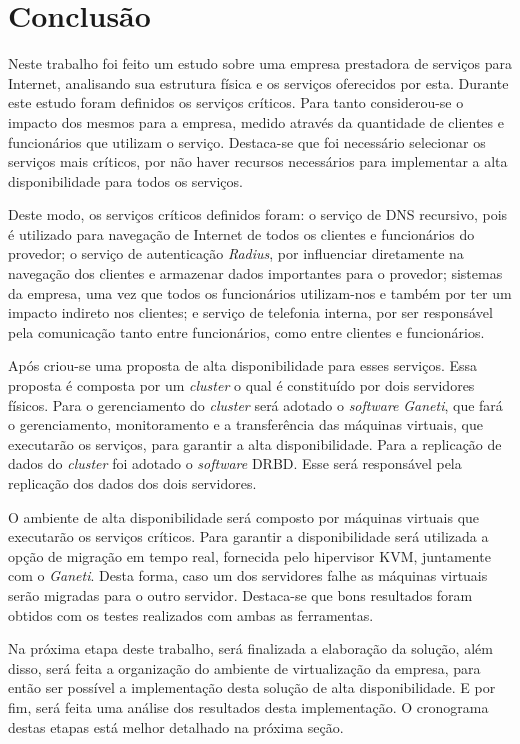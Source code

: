 \chapter{Conclusão}
\label{cap:conclusao}

Neste trabalho foi feito um estudo sobre uma empresa prestadora de serviços para Internet, analisando sua estrutura física e os serviços oferecidos 
por esta. Durante este estudo foram definidos os serviços críticos. Para tanto considerou-se o impacto dos mesmos para a empresa, medido através
da quantidade de clientes e funcionários que utilizam o serviço. Destaca-se que foi necessário selecionar os serviços mais críticos, por não 
haver recursos necessários para implementar a alta disponibilidade para todos os serviços.

Deste modo, os serviços críticos definidos foram: o serviço de \ac{DNS} recursivo, pois é utilizado para navegação de Internet de todos os clientes 
e funcionários do provedor; o serviço de autenticação \textit{Radius}, por influenciar diretamente na navegação dos clientes e armazenar dados 
importantes para o provedor; sistemas da empresa, uma vez que todos os funcionários utilizam-nos e também por ter um impacto indireto nos 
clientes; e serviço de telefonia interna, por ser responsável pela comunicação tanto entre funcionários, como entre clientes e funcionários.

Após criou-se uma proposta de alta disponibilidade para esses serviços. Essa proposta é composta por um \textit{cluster} o qual é constituído 
por dois servidores físicos. Para o gerenciamento do \textit{cluster} será adotado o \textit{software} \textit{Ganeti}, que fará o gerenciamento, 
monitoramento e a transferência das máquinas virtuais, que executarão os serviços, para garantir a alta disponibilidade. Para a replicação de dados 
do \textit{cluster} foi adotado o \textit{software} \ac{DRBD}. Esse será responsável pela replicação dos dados dos dois servidores.

O ambiente de alta disponibilidade será composto por máquinas virtuais que executarão os serviços críticos. Para garantir a disponibilidade 
será utilizada a opção de migração em tempo real, fornecida pelo hipervisor \ac{KVM}, juntamente com o \textit{Ganeti}. Desta forma, 
caso um dos servidores falhe as máquinas virtuais serão migradas para o outro servidor. Destaca-se que bons resultados foram obtidos com os 
testes realizados com ambas as ferramentas.

Na próxima etapa deste trabalho, será finalizada a elaboração da solução, além disso, será feita a organização do ambiente de virtualização 
da empresa, para então ser possível a implementação desta solução de alta disponibilidade. E por fim, será feita uma análise dos resultados 
desta implementação. O cronograma destas etapas está melhor detalhado na próxima seção.

